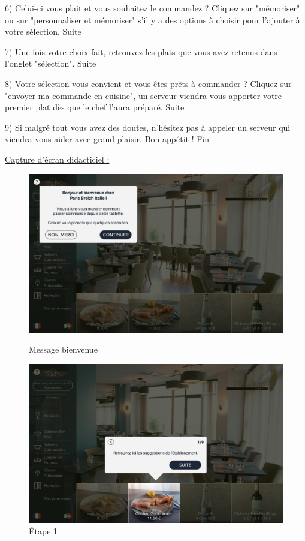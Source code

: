 6) Celui-ci vous plait et vous souhaitez le commandez ? Cliquez sur "mémoriser" ou sur "personnaliser et mémoriser" s'il y a des options à choisir pour l'ajouter à votre sélection.
Suite

7) Une fois votre choix fait, retrouvez les plats que vous avez retenus dans l'onglet "sélection".
Suite

8) Votre sélection vous convient et vous êtes prêts à commander ? Cliquez sur "envoyer ma commande en cuisine", un serveur viendra vous apporter votre premier plat dès que le chef l'aura préparé.
Suite

9) Si malgré tout vous avez des doutes, n'hésitez pas à appeler un serveur qui viendra vous aider avec grand plaisir. Bon appétit !
Fin

\clearpage
\underline{Capture d'écran didacticiel :}

\begin{figure}[!htb]
  \centering
  \begin{minipage}[b]{0.45\textwidth}
    \includegraphics[width=\textwidth]{images/tuto7.png}
    \caption{Message bienvenue}
  \end{minipage}
  \hfill
  \begin{minipage}[b]{0.45\textwidth}
    \includegraphics[width=\textwidth]{images/tuto2.png}
    \caption{Étape 1}
  \end{minipage}
\end{figure}

